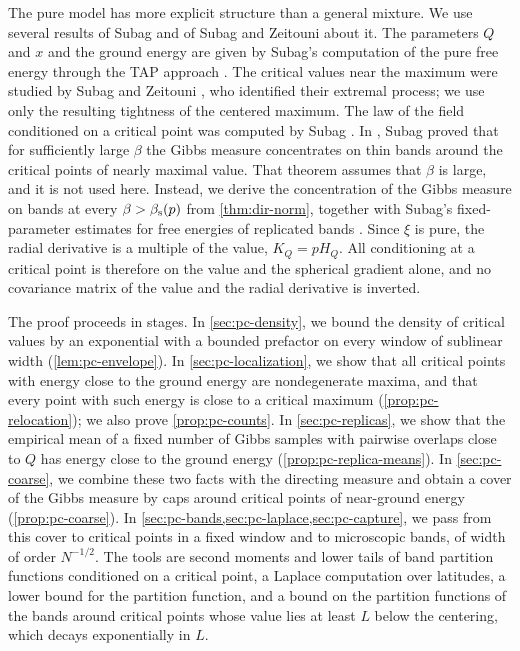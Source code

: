 The pure model has more explicit structure than a general mixture. We use several results of Subag and of Subag and Zeitouni about it. The parameters $Q$ and $x$ and the ground energy are given by Subag's computation of the pure free energy through the TAP approach \cite{Subag2023pure}. The critical values near the maximum were studied by Subag and Zeitouni \cite{SubagZeitouni2017}, who identified their extremal process; we use only the resulting tightness of the centered maximum. The law of the field conditioned on a critical point was computed by Subag \cite{Subag2017geometry}. In \cite[Theorem~1]{Subag2017geometry}, Subag proved that for sufficiently large $\beta$ the Gibbs measure concentrates on thin bands around the critical points of nearly maximal value. That theorem assumes that $\beta$ is large, and it is not used here. Instead, we derive the concentration of the Gibbs measure on bands at every $\beta>\beta_{\mathrm s}(p)$ from \cref{thm:dir-norm}, together with Subag's fixed-parameter estimates for free energies of replicated bands \cite{Subag2024}. Since $\xi$ is pure, the radial derivative is a multiple of the value, $K_Q=pH_Q$. All conditioning at a critical point is therefore on the value and the spherical gradient alone, and no covariance matrix of the value and the radial derivative is inverted.

The proof proceeds in stages. In \cref{sec:pc-density}, we bound the density of critical values by an exponential with a bounded prefactor on every window of sublinear width (\cref{lem:pc-envelope}). In \cref{sec:pc-localization}, we show that all critical points with energy close to the ground energy are nondegenerate maxima, and that every point with such energy is close to a critical maximum (\cref{prop:pc-relocation}); we also prove \cref{prop:pc-counts}. In \cref{sec:pc-replicas}, we show that the empirical mean of a fixed number of Gibbs samples with pairwise overlaps close to $Q$ has energy close to the ground energy (\cref{prop:pc-replica-means}). In \cref{sec:pc-coarse}, we combine these two facts with the directing measure and obtain a cover of the Gibbs measure by caps around critical points of near-ground energy (\cref{prop:pc-coarse}). In \cref{sec:pc-bands,sec:pc-laplace,sec:pc-capture}, we pass from this cover to critical points in a fixed window and to microscopic bands, of width of order $N^{-1/2}$. The tools are second moments and lower tails of band partition functions conditioned on a critical point, a Laplace computation over latitudes, a lower bound for the partition function, and a bound on the partition functions of the bands around critical points whose value lies at least $L$ below the centering, which decays exponentially in $L$.

